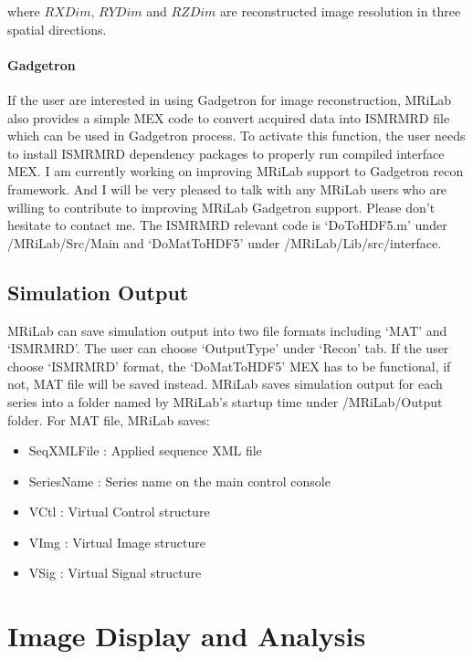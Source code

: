 \documentclass{book}%
\begin{document}
where $RXDim$, $RYDim$ and $RZDim$ are reconstructed image resolution in three spatial directions.

\subsubsection{Gadgetron}

If the user are interested in using Gadgetron for image reconstruction, MRiLab also provides a simple MEX code to convert acquired data into ISMRMRD file which can be used in Gadgetron process. To activate this function, the user needs to install ISMRMRD dependency packages to properly run compiled interface MEX. I am currently working on improving MRiLab support to Gadgetron recon framework. And I will be very pleased to talk with any MRiLab users who are willing to contribute to improving MRiLab Gadgetron support. Please don't hesitate to contact me. The ISMRMRD relevant code is `DoToHDF5.m' under /MRiLab/Src/Main and `DoMatToHDF5' under /MRiLab/Lib/src/interface.

\section{Simulation Output}

MRiLab can save simulation output into two file formats including `MAT' and `ISMRMRD'. The user can choose `OutputType' under `Recon' tab. If the user choose `ISMRMRD' format, the `DoMatToHDF5' MEX has to be functional, if not, MAT file will be saved instead. MRiLab saves simulation output for each series into a folder named by MRiLab's startup time under /MRiLab/Output folder. For MAT file, MRiLab saves:

\begin{itemize}
	\item SeqXMLFile : Applied sequence XML file
	\item SeriesName : Series name on the main control console
	\item VCtl : Virtual Control structure
	\item VImg : Virtual Image structure 
	\item VSig : Virtual Signal structure
\end{itemize}

\chapter{Image Display and Analysis} \label{chap:ImageDisplayAndAnalysis}
\end{document}
